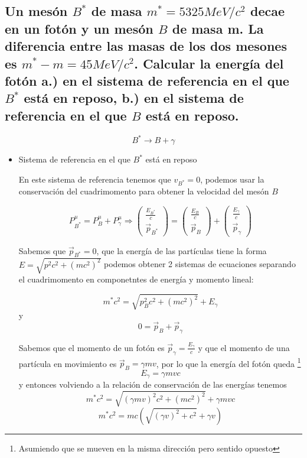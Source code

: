 \documentclass{article}
\begin{document}
\subsection{Un mesón $B^{*}$ de masa $m^{*}=5325 MeV/c^{2}$ decae en un fotón y un mesón $B$ de masa m. La diferencia entre las masas de los dos mesones es $m^{*}-m=45 MeV/c^{2}$. Calcular la energía del fotón
a.) en el sistema de referencia en el que $B^{*}$ está en reposo,
b.) en el sistema de referencia en el que $B$ está en reposo.}

\[B^{*}\longrightarrow B+\gamma\]
\begin{itemize}
  \item Sistema de referencia en el que $B^{*}$ está en reposo
  
  En este sistema de referencia tenemos que $v_{B^{*}}=0$, podemos usar la conservación del cuadrimomento para obtener la velocidad del mesón $B$

  \[P^{\mu}_{B^{*}}=P^{\mu}_{B}+P^{\mu}_{\gamma}\Rightarrow \begin{pmatrix}
      \frac{E_{B^{*}}}{c} \\
      \vec{p}_{B^{*}}
  \end{pmatrix}=\begin{pmatrix}
      \frac{E_{B}}{c} \\
      \vec{p}_{B}
  \end{pmatrix}+\begin{pmatrix}
    \frac{E_{\gamma}}{c}\\
      \vec{p}_{\gamma}
\end{pmatrix}\]

Sabemos que $\vec{p}_{B^{*}}=0$, que la energía de las partículas tiene la forma $E=\sqrt{p^{2}c^{2}+(mc^{2})^{2}}$ podemos obtener 2 sistemas de ecuaciones separando el cuadrimomento en componetntes de energía y momento lineal:

\[m^{*}c^{2}=\sqrt{p_{B}^{2}c^{2}+(mc^{2})^{2}}+ E_{\gamma}\]
y 
\[0=\vec{p}_{B}+\vec{p}_{\gamma}\]

Sabemos que el momento de un fotón es $\vec{p}_{\gamma}= \frac{E_{\gamma}}{c}$ y que el momento de una partícula en movimiento es $\vec{p}_{B}=\gamma m v$, por lo que la energía del fotón queda \footnote{Asumiendo que se mueven en la misma dirección pero sentido opuesto}
\[E_{\gamma}= \gamma mvc\]
y entonces volviendo a la relación de conservación de las energías tenemos 
\[m^{*}c^{2}=\sqrt{(\gamma mv)^{2}c^{2}+(mc^{2})^{2}}+\gamma mvc\]
\[m^{*}c^{2}=mc(\sqrt{(\gamma v)^{2}+c^{2}}+\gamma v)\]


\end{itemize}
\end{document}
